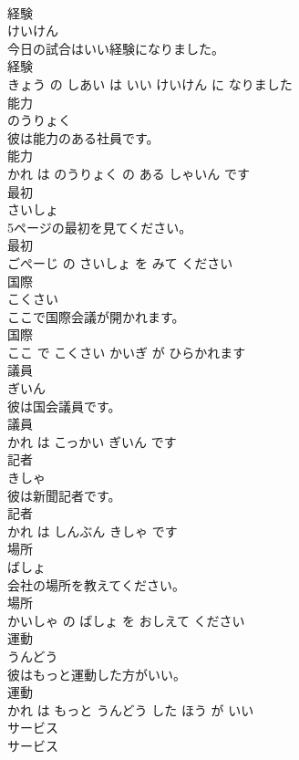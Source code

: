 \documentclass[8pt]{extreport}
\begin{document}
\begin{CJK}{UTF8}{min}
\\	経験	
\\	けいけん			
\\	今日の試合はいい経験になりました。	
\\	経験 
\\	きょう の しあい は いい けいけん に なりました			
\\	能力	
\\	のうりょく			
\\	彼は能力のある社員です。	
\\	能力 
\\	かれ は のうりょく の ある しゃいん です			
\\	最初	
\\	さいしょ			
\\	5ページの最初を見てください。	
\\	最初 
\\	ごぺーじ の さいしょ を みて ください			
\\	国際	
\\	こくさい			
\\	ここで国際会議が開かれます。	
\\	国際 
\\	ここ で こくさい かいぎ が ひらかれます			
\\	議員	
\\	ぎいん			
\\	彼は国会議員です。	
\\	議員 
\\	かれ は こっかい ぎいん です			
\\	記者	
\\	きしゃ			
\\	彼は新聞記者です。	
\\	記者 
\\	かれ は しんぶん きしゃ です			
\\	場所	
\\	ばしょ			
\\	会社の場所を教えてください。	
\\	場所 
\\	かいしゃ の ばしょ を おしえて ください			
\\	運動	
\\	うんどう			
\\	彼はもっと運動した方がいい。	
\\	運動 
\\	かれ は もっと うんどう した ほう が いい			
\\	サービス	
\\	サービス			

\end{CJK}
\end{document}
